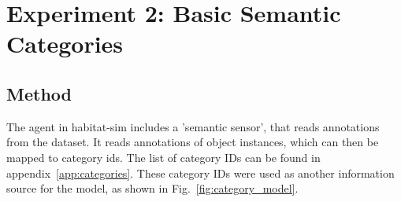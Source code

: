 \section{Experiment 2: Basic Semantic Categories}
\label{sec:exp_2}
\subsection{Method}
The agent in habitat-sim includes a 'semantic sensor', that reads annotations from the dataset. It reads annotations of object instances, which can then be mapped to category ids. The list of category IDs can be found in appendix~\ref{app:categories}. These category IDs were used as another information source for the model, as shown in Fig.~\ref{fig:category_model}.


